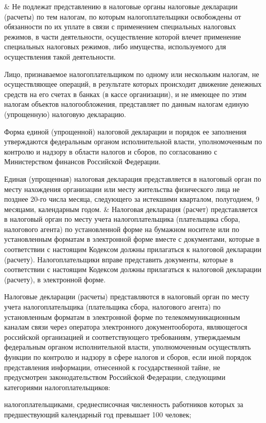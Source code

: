 \documentclass{report}
\begin{document}
& Не подлежат представлению в налоговые органы налоговые декларации (расчеты) по тем налогам, по которым налогоплательщики освобождены от обязанности по их уплате в связи с применением специальных налоговых режимов, в части деятельности, осуществление которой влечет применение специальных налоговых режимов, либо имущества, используемого для осуществления такой деятельности.
\par Лицо, признаваемое налогоплательщиком по одному или нескольким налогам, не осуществляющее операций, в результате которых происходит движение денежных средств на его счетах в банках (в кассе организации), и не имеющее по этим налогам объектов налогообложения, представляет по данным налогам единую (упрощенную) налоговую декларацию.
\par Форма единой (упрощенной) налоговой декларации и порядок ее заполнения утверждаются федеральным органом исполнительной власти, уполномоченным по контролю и надзору в области налогов и сборов, по согласованию с Министерством финансов Российской Федерации.
\par Единая (упрощенная) налоговая декларация представляется в налоговый орган по месту нахождения организации или месту жительства физического лица не позднее 20-го числа месяца, следующего за истекшими кварталом, полугодием, 9 месяцами, календарным годом.
& Налоговая декларация (расчет) представляется в налоговый орган по месту учета налогоплательщика (плательщика сбора, налогового агента) по установленной форме на бумажном носителе или по установленным форматам в электронной форме вместе с документами, которые в соответствии с настоящим Кодексом должны прилагаться к налоговой декларации (расчету). Налогоплательщики вправе представить документы, которые в соответствии с настоящим Кодексом должны прилагаться к налоговой декларации (расчету), в электронной форме.
\par Налоговые декларации (расчеты) представляются в налоговый орган по месту учета налогоплательщика (плательщика сбора, налогового агента) по установленным форматам в электронной форме по телекоммуникационным каналам связи через оператора электронного документооборота, являющегося российской организацией и соответствующего требованиям, утверждаемым федеральным органом исполнительной власти, уполномоченным осуществлять функции по контролю и надзору в сфере налогов и сборов, если иной порядок представления информации, отнесенной к государственной тайне, не предусмотрен законодательством Российской Федерации, следующими категориями налогоплательщиков:
\par налогоплательщиками, среднесписочная численность работников которых за предшествующий календарный год превышает 100 человек;
\end{document}
